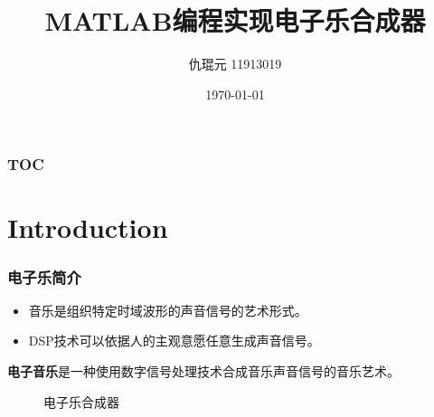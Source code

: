 \documentclass[utf8,10pt]{beamer}
\title{MATLAB编程实现电子乐合成器}
\author{仇琨元 11913019}
\date{\footnotesize \vspace{5mm}\today}
\begin{document}
\begin{frame}

    \titlepage

\end{frame}
\begin{frame}
    \frametitle{TOC}

    \tableofcontents

\end{frame}

\section{Introduction}
\begin{frame}
    \frametitle{电子乐简介}

    \begin{itemize}
        \item 音乐是组织特定时域波形的声音信号的艺术形式。
        \item DSP技术可以依据人的主观意愿任意生成声音信号。
    \end{itemize}

    \textbf{电子音乐}是一种使用数字信号处理技术合成音乐声音信号的音乐艺术。

    \begin{figure}[htpb]
        \centering
        \hfill
        \caption{电子乐合成器}
        \label{fig:synthesizer}
    \end{figure}


\end{frame}
\end{document}

